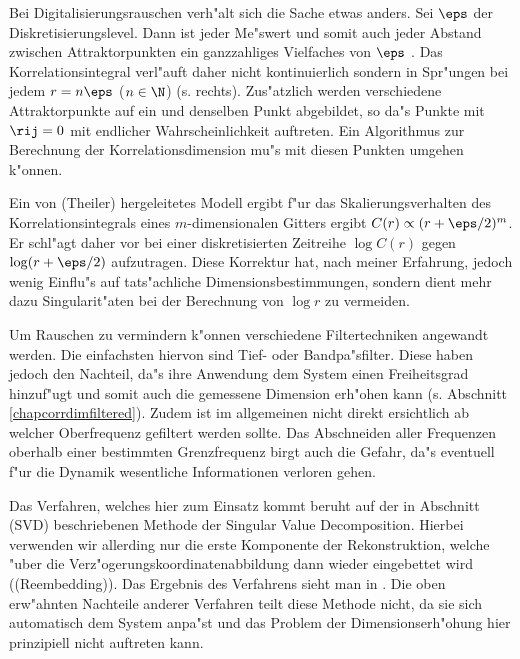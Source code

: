 Bei Digitalisierungsrauschen verh"alt sich die Sache etwas anders. Sei $\eps$ der
Diskretisierungslevel. Dann ist jeder Me"swert und somit auch jeder Abstand zwischen
Attraktorpunkten  ein ganzzahliges Vielfaches von $\eps$ \footnotemark. Das Korrelationsintegral
verl"auft daher nicht kontinuierlich sondern in Spr"ungen bei jedem $r=n\eps$ ($n\in\N$)
(s.  rechts). 
Zus"atzlich werden verschiedene Attraktorpunkte auf ein und denselben Punkt
abgebildet, so da"s Punkte mit $\rij=0$ mit endlicher Wahrscheinlichkeit auftreten. Ein
Algorithmus zur Berechnung der Korrelationsdimension mu"s mit diesen Punkten umgehen
k"onnen.

Ein von \autor(Theiler) hergeleitetes Modell ergibt f"ur das Skalierungsverhalten des
Korrelationsintegrals eines $m$-dimensionalen Gitters ergibt $C(r)\propto(r+\eps/2)^m$. Er 
schl"agt daher vor bei einer diskretisierten Zeitreihe $\log C(r)$ gegen $\log(r+\eps/2)$
aufzutragen\footnotemark. Diese Korrektur hat, nach meiner Erfahrung, jedoch wenig
Einflu"s auf tats"achliche Dimensionsbestimmungen, sondern dient mehr dazu Singularit"aten 
bei der Berechnung von $\log r$ zu vermeiden.

Um Rauschen zu vermindern k"onnen verschiedene Filtertechniken angewandt werden. Die
einfachsten hiervon sind Tief- oder Bandpa"sfilter. Diese haben jedoch den Nachteil, da"s
ihre Anwendung dem System einen Freiheitsgrad hinzuf"ugt und somit auch die gemessene
Dimension erh"ohen kann (s. Abschnitt \ref{chapcorrdimfiltered}). Zudem ist im
allgemeinen nicht direkt ersichtlich ab welcher Oberfrequenz gefiltert werden sollte. Das
Abschneiden aller Frequenzen oberhalb einer bestimmten Grenzfrequenz birgt auch die
Gefahr, da"s eventuell f"ur die Dynamik wesentliche Informationen verloren gehen.

Das Verfahren, welches hier zum Einsatz kommt beruht auf der in Abschnitt \korrektur(SVD)
beschriebenen Methode der Singular Value Decomposition. Hierbei verwenden wir allerding
nur die erste Komponente der Rekonstruktion, welche "uber die
Verz"ogerungskoordinatenabbildung dann wieder eingebettet wird (\begriff(Reembedding)).
Das Ergebnis des Verfahrens sieht man in . Die oben erw"ahnten Nachteile 
anderer Verfahren teilt diese Methode nicht, da sie sich automatisch dem System anpa"st
und das Problem der Dimensionserh"ohung hier prinzipiell nicht auftreten kann.

